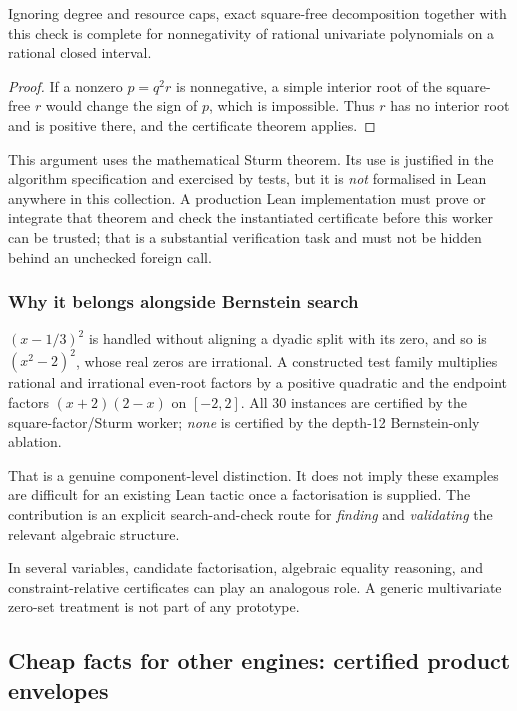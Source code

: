 \begin{proposition}
Ignoring degree and resource caps, exact square-free decomposition together with
this check is complete for nonnegativity of rational univariate polynomials on a
rational closed interval.
\end{proposition}
\begin{proof}
If a nonzero $p=q^2r$ is nonnegative, a simple interior root of the square-free
$r$ would change the sign of $p$, which is impossible. Thus $r$ has no interior
root and is positive there, and the certificate theorem applies.
\end{proof}

This argument uses the mathematical Sturm theorem. Its use is justified in the
algorithm specification and exercised by tests, but it is \emph{not} formalised
in Lean anywhere in this collection. A production Lean implementation must prove
or integrate that theorem and check the instantiated certificate before this
worker can be trusted; that is a substantial verification task and must not be
hidden behind an unchecked foreign call.

\subsubsection*{Why it belongs alongside Bernstein search}

$(x-1/3)^2$ is handled without aligning a dyadic split with its zero, and so is
$(x^2-2)^2$, whose real zeros are irrational. A constructed test family
multiplies rational and irrational even-root factors by a positive quadratic and
the endpoint factors $(x+2)(2-x)$ on $[-2,2]$. All 30 instances are certified by
the square-factor/Sturm worker; \emph{none} is certified by the depth-12
Bernstein-only ablation.

That is a genuine component-level distinction. It does not imply these examples
are difficult for an existing Lean tactic once a factorisation is supplied. The
contribution is an explicit search-and-check route for \emph{finding} and
\emph{validating} the relevant algebraic structure.

In several variables, candidate factorisation, algebraic equality reasoning, and
constraint-relative certificates can play an analogous role. A generic
multivariate zero-set treatment is not part of any prototype.

\subsection{Cheap facts for other engines: certified product envelopes}

